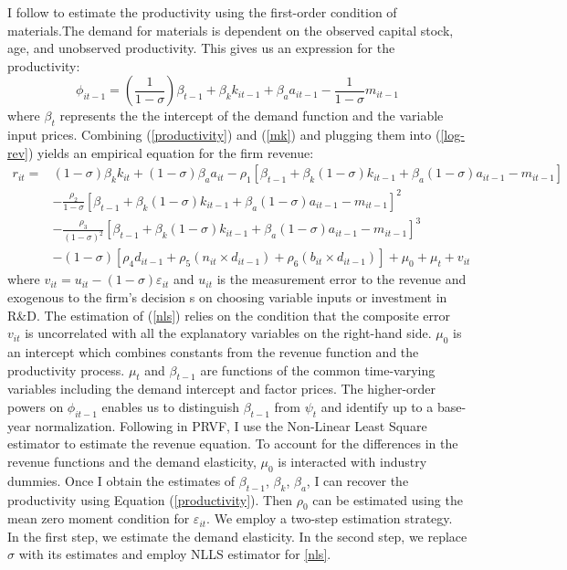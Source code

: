 \documentclass[English]{article}
\begin{document}
I follow \citet{Doraszelski2013} to estimate the productivity using the first-order condition of materials.The demand for materials is dependent on the observed capital stock, age, and unobserved productivity. This gives us an expression for the productivity:
\begin{equation}
\phi_{it-1}=\left(\frac{1}{1-\sigma}\right)\beta_{t-1}+\beta_{k}k_{it-1}+\beta_{a}a_{it-1}-\frac{1}{1-\sigma}m_{it-1}\label{productivity}
\end{equation}
where $\beta_{t}$ represents the the intercept of the demand function
and the variable input prices. Combining (\ref{productivity}) and (\ref{mk}) and plugging them into (\ref{log-rev}) yields an empirical equation for
the firm revenue:
\begin{align} \label{nls}
r_{it}=& \left(1-\sigma\right)\beta_{k}k_{it}+\left(1-\sigma\right)\beta_{a}a_{it}-\rho_{1}\left[\beta_{t-1}+\beta_{k}\left(1-\sigma\right)k_{it-1}+\beta_{a}\left(1-\sigma\right)a_{it-1}-m_{it-1}\right] \\
 & -\frac{\rho_{2}}{1-\sigma}\left[\beta_{t-1}+\beta_{k}\left(1-\sigma\right)k_{it-1}+\beta_{a}\left(1-\sigma\right)a_{it-1}-m_{it-1}\right]^{2} \nonumber \\
 & -\frac{\rho_{3}}{\left(1-\sigma\right)^{2}}\left[\beta_{t-1}+\beta_{k}\left(1-\sigma\right)k_{it-1}+\beta_{a}\left(1-\sigma\right)a_{it-1}-m_{it-1}\right]^{3} \nonumber \\
 & -\left(1-\sigma\right)\left[\rho_{4}d_{it-1}+\rho_{5}\left( n_{it}\times d_{it-1}\right)+\rho_{6}\left( b_{it} \times d_{it-1}\right)\right]+ \mu_{0}+\mu_{t}+v_{it} \nonumber 
\end{align}
where $v_{it}=u_{it}-\left(1-\sigma\right)\varepsilon_{it}$ and 
$u_{it}$ is the measurement error to the revenue and exogenous to
the firm's decision s on choosing variable inputs or investment in
R\&D. The estimation of (\ref{nls}) relies on the condition that
the composite error $v_{it}$ is uncorrelated with all the explanatory
variables on the right-hand side. $\mu_{0}$ is an intercept which
combines constants from the revenue function and the productivity
process. $\mu_{t}$ and $\beta_{t-1}$ are functions of the common
time-varying variables including the demand intercept and factor prices. The higher-order powers on $\phi_{it-1}$ enables us to distinguish
$\beta_{t-1}$ from $\psi_{t}$ and identify up to a base-year normalization. Following in PRVF, I use the Non-Linear Least Square estimator to estimate
the revenue equation. To account for the differences in the revenue functions
and the demand elasticity, $\mu_{0}$ is interacted with industry
dummies. Once I obtain the estimates
of $\beta_{t-1}$, $\beta_{k}$, $\beta_{a}$, I can recover the productivity
using Equation (\ref{productivity}). Then $\rho_{0}$ can be estimated
using the mean zero moment condition for $\varepsilon_{it}$. We employ a two-step estimation strategy. In the first step, we estimate the demand elasticity. In the second step, we replace $\sigma$ with its estimates and employ NLLS estimator for \ref{nls}.
\end{document}
